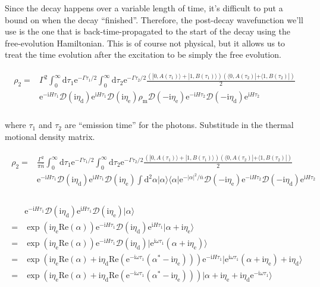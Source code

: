 \documentclass[10pt,fleqn]{article}
\newcommand{\ud}{\mathrm{d}}
\newcommand{\ue}{\mathrm{e}}
\newcommand{\ui}{\mathrm{i}}
\newcommand{\eqar}[1]
{
  \begin{align}
    #1
  \end{align}
}
\newcommand{\paren}[1]{{\left({#1}\right)}}
\newcommand{\abs}[1]{{\left|{#1}\right|}}
\begin{document}
Since the decay happens over a variable length of time,
it's difficult to put a bound on when the decay ``finished''.
Therefore, the post-decay wavefunction we'll use is the one that is
back-time-propagated to the start of the decay using the free-evolution Hamiltonian.
This is of course not physical, but it allows us to treat the time evolution
after the excitation to be simply the free evolution.
\eqar{
  \begin{split}
    \rho_2=&\Gamma^2\int_0^\infty\ud\tau_1\ue^{-\Gamma\tau_1/2}\int_0^\infty\ud\tau_2\ue^{-\Gamma\tau_2/2}\frac{\paren{|0,A(\tau_1)\rangle+|1,B(\tau_1)\rangle}\paren{\langle 0,A(\tau_2)|+\langle 1,B(\tau_2)|}}{2}\\
           &\ue^{-\ui H\tau_1}\mathcal{D}(\ui\eta_{\mathrm{d}})\ue^{\ui H\tau_1}\mathcal{D}(\ui\eta_{\mathrm{e}})\rho_{\mathrm{m}}\mathcal{D}(-\ui\eta_{\mathrm{e}})
             \ue^{-\ui H\tau_2}\mathcal{D}(-\ui\eta_{\mathrm{d}})\ue^{\ui H\tau_2}\\
  \end{split}
}
where $\tau_1$ and $\tau_2$ are ``emission time'' for the photons.
Substitude in the thermal motional density matrix.
\eqar{
  \begin{split}
    \rho_2=&\frac{\Gamma^2}{\pi {\bar n}}\int_0^\infty\ud\tau_1\ue^{-\Gamma\tau_1/2}\int_0^\infty\ud\tau_2\ue^{-\Gamma\tau_2/2}\frac{\paren{|0,A(\tau_1)\rangle+|1,B(\tau_1)\rangle}\paren{\langle 0,A(\tau_2)|+\langle 1,B(\tau_2)|}}{2}\\
           &\ue^{-\ui H\tau_1}\mathcal{D}(\ui\eta_{\mathrm{d}})\ue^{\ui H\tau_1}\mathcal{D}(\ui\eta_{\mathrm{e}})\int\ud^2\alpha |\alpha\rangle\langle\alpha|\ue^{-\abs{\alpha}^2/{\bar n}}\mathcal{D}(-\ui\eta_{\mathrm{e}})
             \ue^{-\ui H\tau_2}\mathcal{D}(-\ui\eta_{\mathrm{d}})\ue^{\ui H\tau_2}\\
  \end{split}
}
\eqar{
  \begin{split}
    &\ue^{-\ui H\tau_1}\mathcal{D}(\ui\eta_{\mathrm{d}})\ue^{\ui H\tau_1}\mathcal{D}(\ui\eta_{\mathrm{e}})|\alpha\rangle\\
    =&\exp\paren{\ui\eta_{\mathrm{e}}\mathrm{Re}(\alpha)}
       \ue^{-\ui H\tau_1}\mathcal{D}(\ui\eta_{\mathrm{d}})\ue^{\ui H\tau_1}
       |\alpha+\ui\eta_{\mathrm{e}}\rangle\\
    =&\exp\paren{\ui\eta_{\mathrm{e}}\mathrm{Re}(\alpha)}
       \ue^{-\ui H\tau_1}\mathcal{D}(\ui\eta_{\mathrm{d}})
       |\ue^{\ui\omega\tau_1}(\alpha+\ui\eta_{\mathrm{e}})\rangle\\
    =&\exp\paren{\ui\eta_{\mathrm{e}}\mathrm{Re}(\alpha)+\ui\eta_{\mathrm{d}}\mathrm{Re}(\ue^{-\ui\omega\tau_1}(\alpha^*-\ui\eta_{\mathrm{e}}))}
       \ue^{-\ui H\tau_1}
       |\ue^{\ui\omega\tau_1}(\alpha+\ui\eta_{\mathrm{e}})+\ui\eta_{\mathrm{d}}\rangle\\
    =&\exp\paren{\ui\eta_{\mathrm{e}}\mathrm{Re}(\alpha)+\ui\eta_{\mathrm{d}}\mathrm{Re}(\ue^{-\ui\omega\tau_1}(\alpha^*-\ui\eta_{\mathrm{e}}))}
       |\alpha+\ui\eta_{\mathrm{e}}+\ui\eta_{\mathrm{d}}\ue^{-\ui\omega\tau_1}\rangle\\
  \end{split}
}
\end{document}
